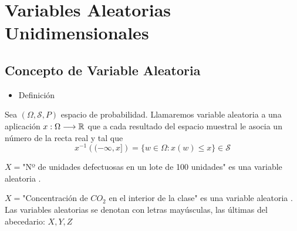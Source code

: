 \section{Variables Aleatorias Unidimensionales}
\subsection{Concepto de Variable Aleatoria}
\begin{itemize}[label=\color{red}\textbullet, leftmargin=*]
	\item \color{lightblue}Definición
\end{itemize}
Sea $(\Omega,\mathcal{S}, P)$ espacio de probabilidad. Llamaremos variable aleatoria a una aplicación $x:\Omega\longrightarrow\operatorname{\mathbb{R}}$ que a cada resultado del espacio muestral le asocia un número de la recta real y tal que \[ x^{-1}\left((-\infty,x]\right)=\{w\in\Omega:x(w)\le x\}\in\mathcal{S} \]
\begin{wrapfigure}{r}{0.5\textwidth}
\end{wrapfigure}

\Ej

$X=$"Nº de unidades defectuosas en un lote de 100 unidades" es una variable aleatoria .

$X=$"Concentración de $CO_2$ en el interior de la clase" es una variable aleatoria .\\
Las variables aleatorias se denotan con letras mayúsculas, las últimas del abecedario: $X,Y,Z$
